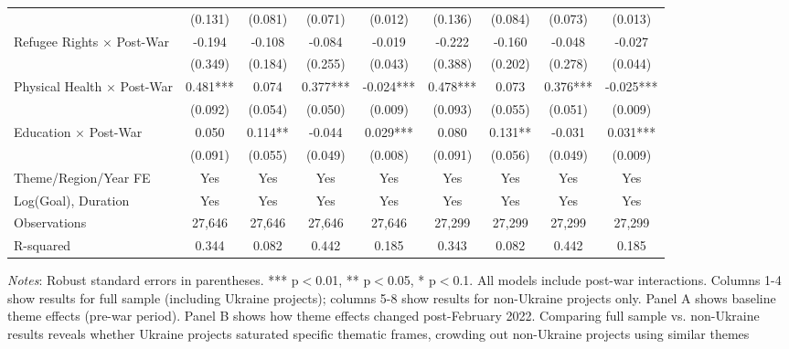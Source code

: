 \begin{table}[htbp]
\begin{threeparttable}
\begin{tabular}{lcccccccc}
& (0.131) & (0.081) & (0.071) & (0.012) & (0.136) & (0.084) & (0.073) & (0.013) \\
Refugee Rights $\times$ Post-War & -0.194 & -0.108 & -0.084 & -0.019 & -0.222 & -0.160 & -0.048 & -0.027 \\
& (0.349) & (0.184) & (0.255) & (0.043) & (0.388) & (0.202) & (0.278) & (0.044) \\
Physical Health $\times$ Post-War & 0.481*** & 0.074 & 0.377*** & -0.024*** & 0.478*** & 0.073 & 0.376*** & -0.025*** \\
& (0.092) & (0.054) & (0.050) & (0.009) & (0.093) & (0.055) & (0.051) & (0.009) \\
Education $\times$ Post-War & 0.050 & 0.114** & -0.044 & 0.029*** & 0.080 & 0.131** & -0.031 & 0.031*** \\
& (0.091) & (0.055) & (0.049) & (0.008) & (0.091) & (0.056) & (0.049) & (0.009) \\
\midrule
Theme/Region/Year FE & Yes & Yes & Yes & Yes & Yes & Yes & Yes & Yes \\
Log(Goal), Duration & Yes & Yes & Yes & Yes & Yes & Yes & Yes & Yes \\
\midrule
Observations & 27,646 & 27,646 & 27,646 & 27,646 & 27,299 & 27,299 & 27,299 & 27,299 \\
R-squared & 0.344 & 0.082 & 0.442 & 0.185 & 0.343 & 0.082 & 0.442 & 0.185 \\
\bottomrule
\end{tabular}
\begin{tablenotes}
\small
\item \textit{Notes}: Robust standard errors in parentheses. *** p$<$0.01, ** p$<$0.05, * p$<$0.1. All models include post-war interactions. Columns 1-4 show results for full sample (including Ukraine projects); columns 5-8 show results for non-Ukraine projects only. Panel A shows baseline theme effects (pre-war period). Panel B shows how theme effects changed post-February 2022. Comparing full sample vs. non-Ukraine results reveals whether Ukraine projects saturated specific thematic frames, crowding out non-Ukraine projects using similar themes
\end{tablenotes}
\end{threeparttable}
\end{table}

